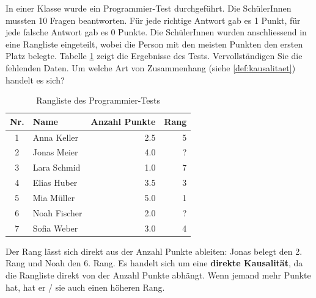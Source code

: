 \begin{myexercise}
	In einer Klasse wurde ein Programmier-Test durchgeführt. Die SchülerInnen mussten 10 Fragen beantworten. Für jede richtige Antwort gab es 1 Punkt, für jede falsche Antwort gab es 0 Punkte. Die SchülerInnen wurden anschliessend in eine Rangliste eingeteilt, wobei die Person mit den meisten Punkten den ersten Platz belegte. Tabelle \ref{tab:rangliste} zeigt die Ergebnisse des Tests. Vervollständigen Sie die fehlenden Daten. Um welche Art von Zusammenhang (siehe \cref{def:kausalitaet}) handelt es sich?
	\begin{table}[H]
		\centering
		\begin{tabular}{clrr}
			\midrule
			Nr. & Name         & Anzahl Punkte & Rang \\
			\midrule
			1   & Anna Keller  & 2.5           & 5    \\
			2   & Jonas Meier  & 4.0           & ?    \\
			3   & Lara Schmid  & 1.0           & 7    \\
			4   & Elias Huber  & 3.5           & 3    \\
			5   & Mia Müller   & 5.0           & 1    \\
			6   & Noah Fischer & 2.0           & ?    \\
			7   & Sofia Weber  & 3.0           & 4    \\
			\midrule
		\end{tabular}
		\caption{Rangliste des Programmier-Tests}
		\label{tab:rangliste}
	\end{table}
	\begin{myanswer}
		Der Rang lässt sich direkt aus der Anzahl Punkte ableiten: Jonas belegt den 2. Rang und Noah den 6. Rang. Es handelt sich um eine \textbf{direkte Kausalität}, da die Rangliste direkt von der Anzahl Punkte abhängt. Wenn jemand mehr Punkte hat, hat er / sie auch einen höheren Rang.
	\end{myanswer}
\end{myexercise}

